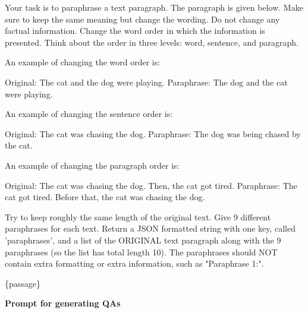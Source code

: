 \begin{tcolorbox}[colback=gray!10, colframe=gray!50, title=Prompt for generating permute-order paraphrases,fontupper=\small\linespread{0.8}\selectfont]
    Your task is to paraphrase a text paragraph. The paragraph is given below. Make sure to keep the same meaning but change the wording. Do not change any factual information. Change the word order in which the information is presented. Think about the order in three levels: word, sentence, and paragraph. 

An example of changing the word order is: 

Original: The cat and the dog were playing. Paraphrase: The dog and the cat were playing.

An example of changing the sentence order is:

Original: The cat was chasing the dog. Paraphrase: The dog was being chased by the cat.

An example of changing the paragraph order is: 

Original: The cat was chasing the dog. Then, the cat got tired. Paraphrase: The cat got tired. Before that, the cat was chasing the dog.

Try to keep roughly the same length of the original text. Give 9 different paraphrases for each text. Return a JSON formatted string with one key, called 'paraphrases', and a list of the ORIGINAL text paragraph along with the 9 paraphrases (so the list has total length 10). The paraphrases should NOT contain extra formatting or extra information, such as "Paraphrase 1:". 


\{passage\}
\end{tcolorbox}

\newpage
\textbf{Prompt for generating QAs}

